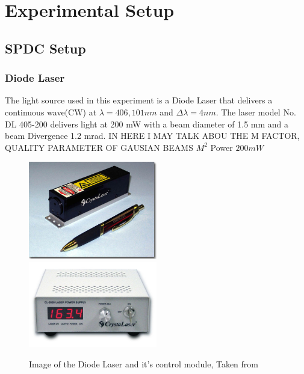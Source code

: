 
\chapter{Experimental Setup} %

\label{Chapter3} %

\section{SPDC Setup}
\subsection{Diode Laser}
The light source used in this experiment is a Diode Laser that delivers a continuous wave(CW) at 
$\lambda = 406,101 nm$ and $\Delta \lambda = 4 nm$. The laser model No. DL 405-200 delivers light at 200 mW with a beam diameter of 1.5 mm and a beam Divergence 1.2 mrad. IN HERE I MAY TALK ABOU THE M FACTOR, QUALITY PARAMETER OF GAUSIAN BEAMS $M^2$ 
Power $200mW$
\begin{figure}[h!]
\centering
{  \includegraphics[width=0.5\textwidth]{Figures/diodeLaser.jpg} }
{  \includegraphics[width=0.5\textwidth]{Figures/diodeLaserControl.jpg} }
\caption{Image of the Diode Laser and it's control module, Taken from \cite{crystalLaser}}
 \label{fig:diodeLaser}
\end{figure}

